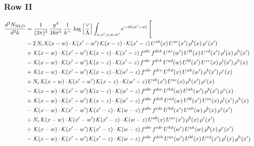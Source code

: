 \documentclass[9pt]{article}
\numberwithin{equation}{section}
\begin{document}
\subsubsection{Row II}
\begin{align}
\frac{d^{3}N_{\mathrm{NLO}}}{d^{3}k} & = \frac{1}{(2\pi)^{3}}\,\frac{g^{4}}{16\pi^{5}}\,\frac{1}{k^{+}}\,\log\Big[\frac{\vee}{\Lambda}\Big]\int_{x,x',z,w,w'}e^{-ik(w'-w)}\,\Bigg[\notag\\ &  -2\,N_{c}\,\mathcal{K}(x-w)\cdot\mathcal{K}(x'-w')\,\mathcal{K}(x-z)\cdot\mathcal{K}(x'-z)\,U^{ab}(x)\,U^{ac}(x')\,\rho^{b}(x)\,\rho^{c}(x')\notag\\
& +\,\mathcal{K}(x-w)\cdot\mathcal{K}(x'-w')\,\mathcal{K}(x-z)\cdot\mathcal{K}(x'-z)\,f^{abc}\,f^{deh}\,U^{ae}(w')\,U^{bl}(x)\,U^{cd}(x')\,\rho^{l}(x)\,\rho^{h}(x')\notag\\
& -\,\mathcal{K}(x-w)\cdot\mathcal{K}(x'-w')\,\mathcal{K}(x-z)\cdot\mathcal{K}(x'-z)\,f^{abc}\,f^{deh}\,U^{ad}(w)\,U^{bl}(x')\,U^{ce}(x)\,\rho^{l}(x')\,\rho^{h}(x)\notag\\
& +\,\mathcal{K}(x-w)\cdot\mathcal{K}(x'-w')\,\mathcal{K}(x-z)\cdot\mathcal{K}(w'-z)\,f^{abc}\,f^{dce}\,U^{hd}(x)\,U^{ah}(w')\,\rho^{b}(x')\,\rho^{e}(x)\notag\\
& +N_{c}\,\mathcal{K}(x-w)\cdot\mathcal{K}(x'-w')\,\mathcal{K}(x-z)\cdot\mathcal{K}(w'-z)\,U^{ab}(x')\,U^{ac}(x)\,\rho^{b}(x')\,\rho^{c}(x)\notag\\
& -\,\mathcal{K}(x-w)\cdot\mathcal{K}(x'-w')\,\mathcal{K}(x-z)\cdot\mathcal{K}(w'-z)\,f^{abc}\,f^{dce}\,U^{hd}(w)\,U^{ah}(w')\,\rho^{b}(x')\,\rho^{e}(x)\notag\\
& +\,\mathcal{K}(x-w)\cdot\mathcal{K}(x'-w')\,\mathcal{K}(x-z)\cdot\mathcal{K}(w'-z)\,f^{abc}\,f^{deh}\,U^{ad}(w)\,U^{bl}(x')\,U^{ce}(x)\,\rho^{l}(x')\,\rho^{h}(x)\notag\\
& -\,\mathcal{K}(x-w)\cdot\mathcal{K}(x'-w')\,\mathcal{K}(x'-z)\cdot\mathcal{K}(w-z)\,f^{abc}\,f^{cde}\,U^{hd}(x')\,U^{ah}(w)\,\rho^{b}(x)\,\rho^{e}(x')\notag\\
& +N_{c}\,\mathcal{K}(x-w)\cdot\mathcal{K}(x'-w')\,\mathcal{K}(x'-z)\cdot\mathcal{K}(w-z)\,U^{ab}(x)\,U^{ac}(x')\,\rho^{b}(x)\,\rho^{c}(x')\notag\\
& +\,\mathcal{K}(x-w)\cdot\mathcal{K}(x'-w')\,\mathcal{K}(x'-z)\cdot\mathcal{K}(w-z)\,f^{abc}\,f^{cde}\,U^{hd}(w')\,U^{ah}(w)\,\rho^{b}(x)\,\rho^{e}(x')\notag\\
& -\,\mathcal{K}(x-w)\cdot\mathcal{K}(x'-w')\,\mathcal{K}(x'-z)\cdot\mathcal{K}(w-z)\,f^{abc}\,f^{deh}\,U^{ae}(w')\,U^{bl}(x)\,U^{cd}(x')\,\rho^{l}(x)\,\rho^{h}(x')\notag\\

\end{align}
\end{document}
